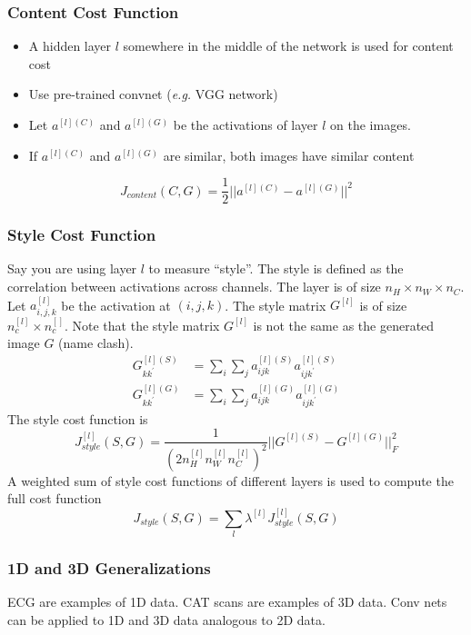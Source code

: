 \documentclass{article}
\begin{document}
\subsubsection{Content Cost Function}
\begin{itemize}
  \item A hidden layer $l$ somewhere in the middle of the network is used for content cost
  \item Use pre-trained convnet (\emph{e.g.} VGG network)
  \item Let $a^{[l](C)}$ and $a^{[l](G)}$ be the activations of layer $l$ on the images.
  \item If $a^{[l](C)}$ and $a^{[l](G)}$ are similar, both images have similar content
\end{itemize}
\begin{equation}
  J_{content}(C, G) = \frac{1}{2} ||a^{[l](C)} - a^{[l](G)}||^2
\end{equation}

\subsubsection{Style Cost Function}
Say you are using layer $l$ to measure ``style''.
The style is defined as the correlation between activations across channels.
The layer is of size $n_H\times n_W\times n_C$.
Let $a^{[l]}_{i,j,k}$ be the activation at $(i,j,k)$.
The style matrix $G^{[l]}$ is of size $n_c^{[l]}\times n_c^{[]}$.
Note that the style matrix $G^{[l]}$ is not the same as the generated image $G$ (name clash).
\begin{equation}
  \begin{split}
    G^{[l](S)}_{kk^\prime}&=\sum_i\sum_j a^{[l](S)}_{ijk} a^{[l](S)}_{ijk^\prime}\\
    G^{[l](G)}_{kk^\prime}&=\sum_i\sum_j a^{[l](G)}_{ijk} a^{[l](G)}_{ijk^\prime}
  \end{split}
\end{equation}
The style cost function is
\begin{equation}
  J^{[l]}_{style}(S, G)=\frac{1}{(2n^{[l]}_Hn^{[l]}_Wn^{[l]}_C)^2}||G^{[l](S)}-G^{[l](G)}||^2_F
\end{equation}
A weighted sum of style cost functions of different layers is used to compute the full cost function
\begin{equation}
  J_{style}(S,G)=\sum_l \lambda^{[l]} J^{[l]}_{style}(S,G)
\end{equation}

\subsubsection{1D and 3D Generalizations}
ECG are examples of 1D data.
CAT scans are examples of 3D data.
Conv nets can be applied to 1D and 3D data analogous to 2D data.
\end{document}

